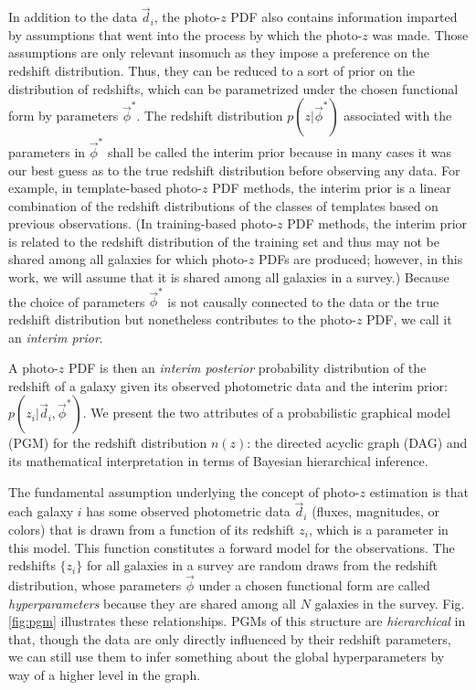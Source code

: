 \documentclass[iop]{emulateapj}
\begin{document}
In addition to the data $\vec{d}_{i}$, the photo-$z$ PDF also contains 
information imparted by assumptions that went into the process by which the 
photo-$z$ was made.  Those assumptions are only relevant insomuch as they 
impose a preference on the redshift distribution. Thus, they can be reduced to 
a sort of prior on the distribution of redshifts, which can be parametrized 
under the chosen functional form by parameters $\vec{\phi}^{*}$.  The redshift 
distribution $p(z | \vec{\phi}^{*})$ associated with the parameters in 
$\vec{\phi}^{*}$ shall be called the interim prior because in many cases it was 
our best guess as to the true redshift distribution before observing any data.  
For example, in template-based photo-$z$ PDF methods, the interim prior is a 
linear combination of the redshift distributions of the classes of templates 
based on previous observations.  (In training-based photo-$z$ PDF methods, the 
interim prior is related to the redshift distribution of the training set and 
thus may not be shared among all galaxies for which photo-$z$ PDFs are 
produced; however, in this work, we will assume that it is shared among all 
galaxies in a survey.)  Because the choice of parameters $\vec{\phi}^{*}$ is 
not causally connected to the data or the true redshift distribution but 
nonetheless contributes to the photo-$z$ PDF, we call it an \textit{interim 
prior}.  

A photo-$z$ PDF is then an \textit{interim posterior} probability distribution 
of the redshift of a galaxy given its observed photometric data and the interim 
prior: $p(z_{i} | \vec{d}_{i}, \vec{\phi}^{*})$.  
We present the two attributes of a probabilistic graphical model (PGM) for the 
redshift distribution $n(z)$: the directed acyclic graph (DAG) and its 
mathematical interpretation in terms of Bayesian hierarchical inference.  

The fundamental assumption underlying the concept of photo-$z$ estimation is 
that each galaxy $i$ has some observed photometric data $\vec{d}_{i}$ (fluxes, 
magnitudes, or colors) that is drawn from a function of its redshift $z_{i}$, 
which is a parameter in this model.  This function constitutes a forward model 
for the observations.  The redshifts $\{z_{i}\}$ for all galaxies in a survey 
are random draws from the redshift distribution, whose parameters  $\vec{\phi}$ 
under a chosen functional form are called \textit{hyperparameters} because they 
are shared among all $N$ galaxies in the survey.  Fig. \ref{fig:pgm} 
illustrates these relationships.  PGMs of this structure are 
\textit{hierarchical} in that, though the data are only directly influenced by 
their redshift parameters, we can still use them to infer something about the 
global hyperparameters by way of a higher level in the graph.
\end{document}
